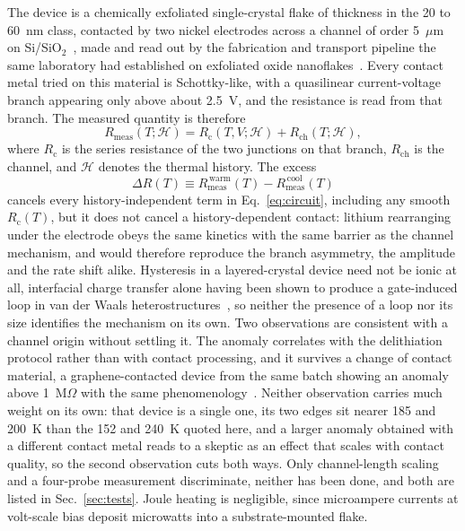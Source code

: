 \documentclass[reprint,twocolumn,prb,amsmath,amssymb,superscriptaddress,floatfix]{revtex4-2}
\begin{document}
The device is a chemically exfoliated single-crystal flake of thickness in the 20 to 60~nm
class, contacted by two nickel electrodes across a channel of order 5~$\mu$m on
Si/SiO$_2$~\cite{Crowley2020}, made and read out by the fabrication and transport pipeline the
same laboratory had established on exfoliated oxide nanoflakes~\cite{Crowley2018}. Every contact
metal tried on this material is Schottky-like,
with a quasilinear current-voltage branch appearing only above about 2.5~V, and the resistance
is read from that branch. The measured quantity is therefore
\begin{equation}
  R_{\mathrm{meas}}(T;\mathcal{H})
  = R_{\mathrm{c}}(T,V;\mathcal{H}) + R_{\mathrm{ch}}(T;\mathcal{H}),
  \label{eq:circuit}
\end{equation}
where $R_{\mathrm{c}}$ is the series resistance of the two junctions on that branch,
$R_{\mathrm{ch}}$ is the channel, and $\mathcal{H}$ denotes the thermal history. The excess
\begin{equation*}
  \Delta R(T) \equiv R_{\mathrm{meas}}^{\,\mathrm{warm}}(T)
  - R_{\mathrm{meas}}^{\,\mathrm{cool}}(T)
\end{equation*}
cancels every history-independent term in Eq.~\eqref{eq:circuit}, including any smooth
$R_{\mathrm{c}}(T)$, but it does not cancel a history-dependent contact: lithium rearranging
under the electrode obeys the same kinetics with the same barrier as the channel mechanism, and
would therefore reproduce the branch asymmetry, the amplitude and the rate shift alike. Hysteresis
in a layered-crystal device need not be ionic at all, interfacial charge transfer alone having
been shown to produce a gate-induced loop in van der Waals heterostructures~\cite{Kumar2020}, so
neither the presence of a loop nor its size identifies the mechanism on its own. Two
observations are consistent with a channel origin without settling it. The anomaly correlates
with the delithiation protocol rather than with contact processing, and it survives a change of
contact material, a graphene-contacted device from the same batch showing an anomaly above
1~M$\Omega$ with the same phenomenology~\cite{Crowley2020,RadhaPerspective2021}. Neither
observation carries much weight on its own: that device is a single one, its two edges sit
nearer 185 and 200~K than the 152 and 240~K quoted here, and a larger anomaly obtained with a
different contact metal reads to a skeptic as an effect that scales with contact quality, so
the second observation cuts both ways. Only channel-length scaling and a four-probe measurement
discriminate, neither has been done, and both are listed in Sec.~\ref{sec:tests}. Joule heating
is negligible, since microampere currents at volt-scale bias deposit microwatts into a
substrate-mounted flake.
\end{document}

